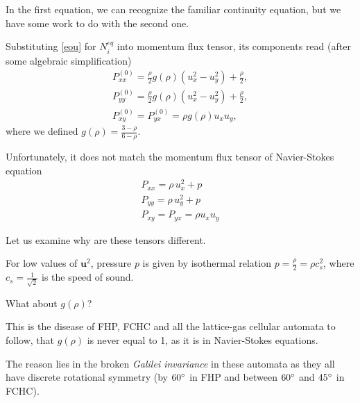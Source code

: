 In the first equation, we can recognize the familiar continuity equation, but we have some work to do with the second one.

Substituting \ref{eou} for $N_i^{eq}$ into momentum flux tensor, its components read (after some algebraic simplification)
\begin{equation} \label{FHPT}
\begin{split}
P_{xx}^{(0)} = \frac{\rho}{2}g(\rho)(u_x^2 - u_y^2) + \frac{\rho}{2},\\
P_{yy}^{(0)} = \frac{\rho}{2}g(\rho) (u_x^2 - u_y^2) + \frac{\rho}{2},\\
P_{xy}^{(0)} = P_{yx}^{(0)} = \rho g(\rho)u_xu_y,
\end{split}
\end{equation}
where we defined $g(\rho) =  \frac{3-\rho}{6 - \rho}$.

Unfortunately, it does not match the momentum flux tensor of Navier-Stokes equation
\begin{equation} \label{NST}
\begin{split}
P_{xx} = \rho \, u_x^2 + p\\
P_{yy} = \rho\, u_y^2 + p\\
P_{xy} = P_{yx} = \rho u_x u_y
\end{split}
\end{equation}

Let us examine why are these tensors different.

For low values of $\bm{u}^2$, pressure $p$ is given by isothermal relation $p = \frac{\rho}{2} = \rho c_s^2$, where $c_s = \frac{1}{\sqrt{2}}$ is the speed of sound\cite{wolf}.

What about $g(\rho)$?  

This is the disease of FHP, FCHC and all the lattice-gas cellular automata to follow, that $g(\rho)$ is never equal to 1, as it is in Navier-Stokes equations.

The reason lies in the broken \textit{Galilei invariance} in these automata as they all have discrete rotational symmetry (by $60 \degree$ in FHP and between $60 \degree$ and $45 \degree$ in FCHC).

